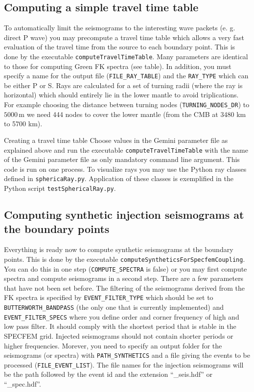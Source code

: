 \subsection{Computing a simple travel time table}
%
To automatically limit the seismograms to the interesting wave packets (e. g. direct P wave) you may precompute a travel time table which allows a very fast evaluation of the travel time from the source to each boundary point. This is done by the executable \verb+computeTravelTimeTable+. Many parameters are identical to those for computing Green FK spectra (see table). In addition, you must specify a name for the output file (\verb+FILE_RAY_TABLE+) and the \verb+RAY_TYPE+ which can be either P or S. Rays are calculated for a set of turning radii (where the ray is horizontal) which should entirely lie in the lower mantle to avoid triplications. For example choosing the distance between turning nodes (\verb+TURNING_NODES_DR+) to $5000$\,m we need 444 nodes to cover the lower mantle (from the CMB at 3480 km to 5700 km).
%
\begin{actionbox}[label={action:travel-time-table},float=h!]{Creating a travel time table}
   Choose values in the Gemini parameter file as explained above and run the executable \verb+computeTravelTimeTable+ with the name of the Gemini parameter file as only mandatory command line argument. This code is run on one process. To visualize rays you may use the Python ray classes defined in \verb+sphericaRay.py+. Application of these classes is exemplified in the Python script \verb+testSphericalRay.py+.
\end{actionbox}
%
\subsection{Computing synthetic injection seismograms at the boundary points}
\label{sec:bpseis}
%
Everything is ready now to compute synthetic seismograms at the boundary points. This is done by the executable \verb+computeSyntheticsForSpecfemCoupling+. You can do this in one step (\verb+COMPUTE_SPECTRA+ is false) or you may first compute spectra and compute seismograms in a second step. There are a few parameters that have not been set before. The filtering of the seismograms derived from the FK spectra is specified by \verb+EVENT_FILTER_TYPE+ which should be set to \verb+BUTTERWORTH_BANDPASS+ (the only one that is currently implemented) and \verb+EVENT_FILTER_SPECS+ where you define order and corner frequency of high and low pass filter. It should comply with the shortest period that is stable in the SPECFEM grid. Injected seismograms should not contain shorter periods or higher frequencies. Morever, you need to specify an output folder for the seismograms (or spectra) with \verb+PATH_SYNTHETICS+ and a file giving the events to be processed (\verb+FILE_EVENT_LIST+). The file names for the injection seismograms will be the path followed by the event id and the extension ``\_seis.hdf'' or ``\_spec.hdf''.


